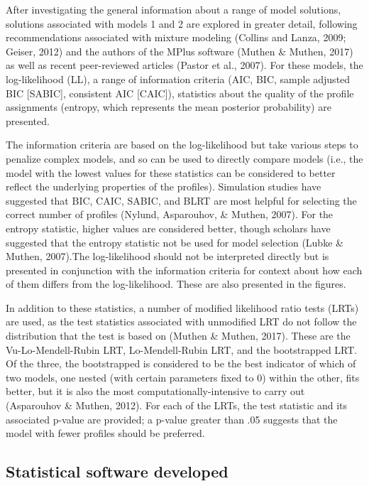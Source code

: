\documentclass[]{msu-thesis}
\theoremstyle{definition}
\theoremstyle{definition}
\theoremstyle{definition}
\theoremstyle{remark}
\begin{document}
After investigating the general information about a range of model
solutions, solutions associated with models 1 and 2 are explored in
greater detail, following recommendations associated with mixture
modeling (Collins and Lanza, 2009; Geiser, 2012) and the authors of the
MPlus software (Muthen \& Muthen, 2017) as well as recent peer-reviewed
articles (Pastor et al., 2007). For these models, the log-likelihood
(LL), a range of information criteria (AIC, BIC, sample adjusted BIC
{[}SABIC{]}, consistent AIC {[}CAIC{]}), statistics about the quality of
the profile assignments (entropy, which represents the mean posterior
probability) are presented.

The information criteria are based on the log-likelihood but take
various steps to penalize complex models, and so can be used to directly
compare models (i.e., the model with the lowest values for these
statistics can be considered to better reflect the underlying properties
of the profiles). Simulation studies have suggested that BIC, CAIC,
SABIC, and BLRT are most helpful for selecting the correct number of
profiles (Nylund, Asparouhov, \& Muthen, 2007). For the entropy
statistic, higher values are considered better, though scholars have
suggested that the entropy statistic not be used for model selection
(Lubke \& Muthen, 2007).The log-likelihood should not be interpreted
directly but is presented in conjunction with the information criteria
for context about how each of them differs from the log-likelihood.
These are also presented in the figures.

In addition to these statistics, a number of modified likelihood ratio
tests (LRTs) are used, as the test statistics associated with unmodified
LRT do not follow the distribution that the test is based on (Muthen \&
Muthen, 2017). These are the Vu-Lo-Mendell-Rubin LRT, Lo-Mendell-Rubin
LRT, and the bootstrapped LRT. Of the three, the bootstrapped is
considered to be the best indicator of which of two models, one nested
(with certain parameters fixed to 0) within the other, fits better, but
it is also the most computationally-intensive to carry out (Asparouhov
\& Muthen, 2012). For each of the LRTs, the test statistic and its
associated p-value are provided; a p-value greater than .05 suggests
that the model with fewer profiles should be preferred.

\subsection{Statistical software
developed}\label{statistical-software-developed}
\end{document}
